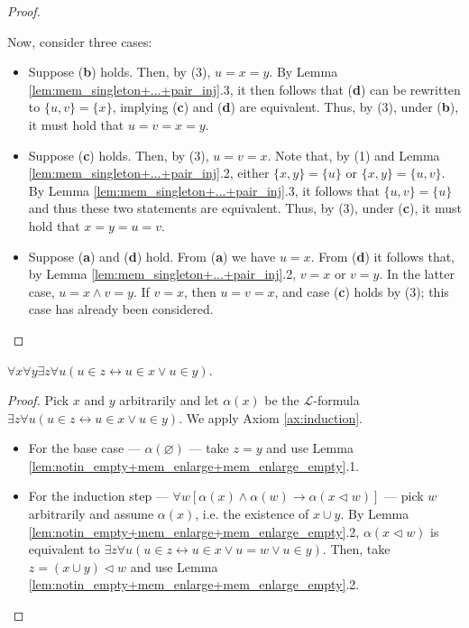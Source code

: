 \begin{proof}
\begin{enumerate}
        Now, consider three cases:
        \begin{itemize}
            \item Suppose (\textbf{b}) holds. Then, by (3), $u=x=y$. 
            By Lemma \ref{lem:mem_singleton+...+pair_inj}.3, it then follows that 
            (\textbf{d}) can be rewritten to $\{u,v\}=\{x\}$, 
            implying (\textbf{c}) and (\textbf{d}) are equivalent.
            Thus, by (3), under (\textbf{b}), it must hold that $u=v=x=y$.
            \item Suppose (\textbf{c}) holds. 
            Then, by (3), $u=v=x$. 
            Note that, by (1) and Lemma \ref{lem:mem_singleton+...+pair_inj}.2, 
            either $\{x,y\}=\{u\}$ or $\{x,y\}=\{u,v\}$.  
            By Lemma \ref{lem:mem_singleton+...+pair_inj}.3, it follows that $\{u,v\}=\{u\}$ and 
            thus these two statements are equivalent. 
            Thus, by (3), under (\textbf{c}), it must hold that $x=y=u=v$.
            \item Suppose (\textbf{a}) and (\textbf{d}) hold. From (\textbf{a}) we have $u=x$. 
            From (\textbf{d}) it follows that, by 
            Lemma \ref{lem:mem_singleton+...+pair_inj}.2, $v=x$ or $v=y$. 
            In the latter case, $u=x\land v=y$. 
            If $v=x$, then $u=v=x$, and case (\textbf{c}) holds by (3); 
            this case has already been considered.
        \end{itemize}
    \end{enumerate}
\end{proof}

\begin{theorem}
    \label{thm:exists_union}
    \leanok
    $\forall x \forall y \exists z \forall u (u \in z \leftrightarrow u \in x \lor u \in y)$.
\end{theorem}

\begin{proof}
    \leanok
    Pick $x$ and $y$ arbitrarily and let $\alpha (x)$ be the $\mathcal{L}$-formula 
    $\exists z \forall u (u \in z \leftrightarrow u \in x \lor u \in y)$.
    We apply Axiom \ref{ax:induction}.
    \begin{itemize}
        \item For the base case — $\alpha (\varnothing)$ — take $z=y$ and use 
        Lemma \ref{lem:notin_empty+mem_enlarge+mem_enlarge_empty}.1.
        \item For the induction step 
        — $\forall w[\alpha(x) \land \alpha(w) \rightarrow \alpha(x \lhd w)]$ — 
        pick $w$ arbitrarily and assume $\alpha(x)$, i.e. the existence of $x \cup y$. 
        By Lemma \ref{lem:notin_empty+mem_enlarge+mem_enlarge_empty}.2, 
        $\alpha(x \lhd w)$ is equivalent to 
        $\exists z \forall u (u \in z \leftrightarrow u \in x \lor u = w \lor u \in y)$.
        Then, take $z= (x \cup y) \lhd w$ and use 
        Lemma \ref{lem:notin_empty+mem_enlarge+mem_enlarge_empty}.2.
    \end{itemize}
\end{proof}

